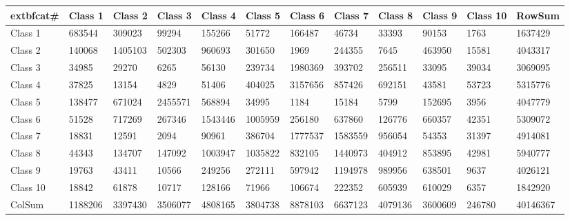 ﻿\begin{table}[!ht]
    \centering
    \begin{tabular}{|l|l|l|l|l|l|l|l|l|l|l|l|}
    \hline
        	extbf{cat\#} & \textbf{Class 1} & \textbf{Class 2} & \textbf{Class 3} & \textbf{Class 4} & \textbf{Class 5} & \textbf{Class 6} & \textbf{Class 7} & \textbf{Class 8} & \textbf{Class 9} & \textbf{Class 10} & \textbf{RowSum} \\ \hline
        Class 1 & 683544 & 309023 & 99294 & 155266 & 51772 & 166487 & 46734 & 33393 & 90153 & 1763 & 1637429 \\ \hline
        Class 2 & 140068 & 1405103 & 502303 & 960693 & 301650 & 1969 & 244355 & 7645 & 463950 & 15581 & 4043317 \\ \hline
        Class 3 & 34985 & 29270 & 6265 & 56130 & 239734 & 1980369 & 393702 & 256511 & 33095 & 39034 & 3069095 \\ \hline
        Class 4 & 37825 & 13154 & 4829 & 51406 & 404025 & 3157656 & 857426 & 692151 & 43581 & 53723 & 5315776 \\ \hline
        Class 5 & 138477 & 671024 & 2455571 & 568894 & 34995 & 1184 & 15184 & 5799 & 152695 & 3956 & 4047779 \\ \hline
        Class 6 & 51528 & 717269 & 267346 & 1543446 & 1005959 & 256180 & 637860 & 126776 & 660357 & 42351 & 5309072 \\ \hline
        Class 7 & 18831 & 12591 & 2094 & 90961 & 386704 & 1777537 & 1583559 & 956054 & 54353 & 31397 & 4914081 \\ \hline
        Class 8 & 44343 & 134707 & 147092 & 1003947 & 1035822 & 832105 & 1440973 & 404912 & 853895 & 42981 & 5940777 \\ \hline
        Class 9 & 19763 & 43411 & 10566 & 249256 & 272111 & 597942 & 1194978 & 989956 & 638501 & 9637 & 4026121 \\ \hline
        Class 10 & 18842 & 61878 & 10717 & 128166 & 71966 & 106674 & 222352 & 605939 & 610029 & 6357 & 1842920 \\ \hline
        ColSum & 1188206 & 3397430 & 3506077 & 4808165 & 3804738 & 8878103 & 6637123 & 4079136 & 3600609 & 246780 & 40146367 \\ \hline
    \end{tabular}
\end{table}